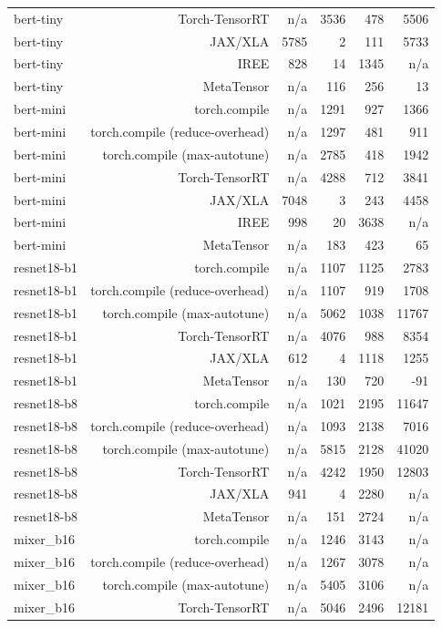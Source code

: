\begin{tabular}{lrrrrr}
bert-tiny & Torch-TensorRT & n/a & 3536 & 478 & 5506 \\
bert-tiny & JAX/XLA & 5785 & 2 & 111 & 5733 \\
bert-tiny & IREE & 828 & 14 & 1345 & n/a \\
bert-tiny & MetaTensor & n/a & 116 & 256 & 13 \\
bert-mini & torch.compile & n/a & 1291 & 927 & 1366 \\
bert-mini & torch.compile (reduce-overhead) & n/a & 1297 & 481 & 911 \\
bert-mini & torch.compile (max-autotune) & n/a & 2785 & 418 & 1942 \\
bert-mini & Torch-TensorRT & n/a & 4288 & 712 & 3841 \\
bert-mini & JAX/XLA & 7048 & 3 & 243 & 4458 \\
bert-mini & IREE & 998 & 20 & 3638 & n/a \\
bert-mini & MetaTensor & n/a & 183 & 423 & 65 \\
resnet18-b1 & torch.compile & n/a & 1107 & 1125 & 2783 \\
resnet18-b1 & torch.compile (reduce-overhead) & n/a & 1107 & 919 & 1708 \\
resnet18-b1 & torch.compile (max-autotune) & n/a & 5062 & 1038 & 11767 \\
resnet18-b1 & Torch-TensorRT & n/a & 4076 & 988 & 8354 \\
resnet18-b1 & JAX/XLA & 612 & 4 & 1118 & 1255 \\
resnet18-b1 & MetaTensor & n/a & 130 & 720 & -91 \\
resnet18-b8 & torch.compile & n/a & 1021 & 2195 & 11647 \\
resnet18-b8 & torch.compile (reduce-overhead) & n/a & 1093 & 2138 & 7016 \\
resnet18-b8 & torch.compile (max-autotune) & n/a & 5815 & 2128 & 41020 \\
resnet18-b8 & Torch-TensorRT & n/a & 4242 & 1950 & 12803 \\
resnet18-b8 & JAX/XLA & 941 & 4 & 2280 & n/a \\
resnet18-b8 & MetaTensor & n/a & 151 & 2724 & n/a \\
mixer\_b16 & torch.compile & n/a & 1246 & 3143 & n/a \\
mixer\_b16 & torch.compile (reduce-overhead) & n/a & 1267 & 3078 & n/a \\
mixer\_b16 & torch.compile (max-autotune) & n/a & 5405 & 3106 & n/a \\
mixer\_b16 & Torch-TensorRT & n/a & 5046 & 2496 & 12181 \\

\end{tabular}
